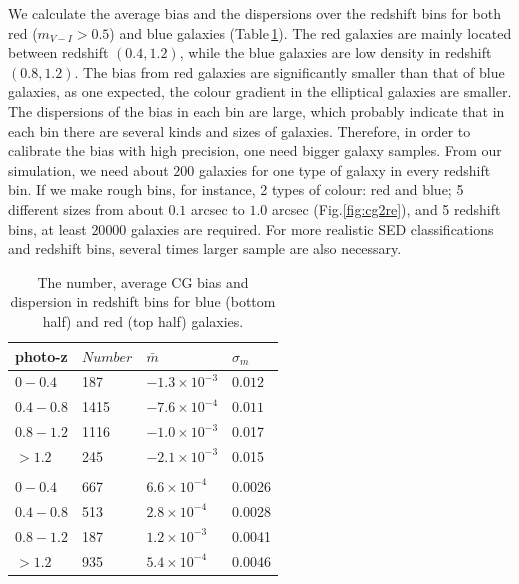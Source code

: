 \documentclass[useAMS,usenatbib]{mn2e}
\newcommand{\be}{\begin{equation}}
\newcommand{\ee}{\end{equation}}
\begin{document}
We calculate the average bias and the dispersions over the redshift
bins for both red ($m_{V-I}>0.5$) and blue galaxies
(Table\,\ref{table:calibration}). The red galaxies are mainly located
between redshift $(0.4,1.2)$, while the blue galaxies are low density
in redshift $(0.8,1.2)$. The bias from red galaxies are significantly
smaller than that of blue galaxies, as one expected, the colour
gradient in the elliptical galaxies are smaller. The dispersions of
the bias in each bin are large, which probably indicate that in each
bin there are several kinds and sizes of galaxies. Therefore, in
order to calibrate the bias with high precision, one need bigger
galaxy samples. From our simulation, we need about $200$ galaxies for
one type of galaxy in every redshift bin. If we make rough bins, for
instance, 2 types of colour: red and blue; 5 different sizes from
about $0.1$ arcsec to $1.0$ arcsec (Fig.\ref{fig:cg2re}), and 5
redshift bins, at least $20 000$ galaxies are required.  For more
realistic SED classifications and redshift bins, several times larger
sample are also necessary.


\begin{center}
\begin{table}
  \begin{tabular}{llll}
    \hline
    photo-z    &$Number$  &$\bar{m}$  &$\sigma_m$ \\
    \hline
    $0-0.4$   &187  &$-1.3\times10^{-3}$  &$0.012$\\
    $0.4-0.8$  &1415 &$-7.6\times10^{-4}$  &$0.011$\\
    $0.8-1.2$  &1116 &$-1.0\times10^{-3}$  &0.017\\
    $>1.2$  &245  &$-2.1\times10^{-3}$  &0.015\\
    \\
    $0-0.4$  &667  &$6.6\times10^{-4}$  &0.0026\\
    $0.4-0.8$ &513  &$2.8\times10^{-4}$  &0.0028\\
    $0.8-1.2$ &187  &$1.2\times10^{-3}$  &0.0041\\
    $>1.2$  &935  &$5.4\times10^{-4}$  &0.0046\\
    \hline
  \end{tabular}
  \caption{\label{table:calibration}The number, average CG bias and dispersion
  in redshift bins for blue (bottom half) and red (top half) galaxies. }
\end{table}
\end{center}

\end{document}
